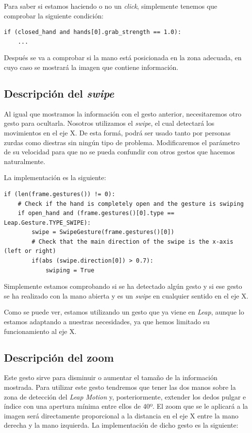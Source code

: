 \documentclass[11pt,a4paper]{article}
\begin{document}
Para saber si estamos haciendo o no un \textit{click}, simplemente tenemos que
comprobar la siguiente condición:

\begin{lstlisting}
if (closed_hand and hands[0].grab_strength == 1.0):
	...
\end{lstlisting}

Después se va a comprobar si la mano está posicionada en la zona adecuada, en cuyo caso se
mostrará la imagen que contiene información.

\subsection{Descripción del \textit{swipe}}

Al igual que mostramos la información con el gesto anterior, necesitaremos otro gesto para ocultarla. Nosotros utilizamos el \textit{swipe}, el cual
detectará los movimientos en el eje X. De esta formá, podrá ser usado tanto por personas zurdas como diestras sin ningún tipo de problema.
Modificaremos el parámetro de su velocidad para que no se pueda confundir con otros gestos que hacemos naturalmente.

La implementación es la siguiente:

\begin{lstlisting}
if (len(frame.gestures()) != 0):
	# Check if the hand is completely open and the gesture is swiping
	if open_hand and (frame.gestures()[0].type == Leap.Gesture.TYPE_SWIPE):
		swipe = SwipeGesture(frame.gestures()[0])
		# Check that the main direction of the swipe is the x-axis (left or right)
		if(abs (swipe.direction[0]) > 0.7):
			swiping = True
\end{lstlisting}

Simplemente estamos comprobando si se ha detectado algún gesto y si ese gesto
se ha realizado con la mano abierta y es un \textit{swipe} en cualquier sentido
en el eje X.

Como se puede ver, estamos utilizando un gesto que ya viene en \textit{Leap}, aunque
lo estamos adaptando a nuestras necesidades, ya que hemos limitado su funcionamiento
al eje X.

\subsection{Descripción del zoom}

Este gesto sirve para disminuir o aumentar el tamaño de la información mostrada. Para utilizar este gesto tendremos que tener las dos manos
sobre la zona de detección del \textit{Leap Motion} y, posteriormente, extender los dedos pulgar e índice con una apertura mínima entre ellos de 40º.
El zoom que se le aplicará a la imagen será directamente proporcional a la distancia en el eje X entre la mano derecha y la mano izquierda. La
implementación de dicho gesto es la siguiente:
\end{document}
